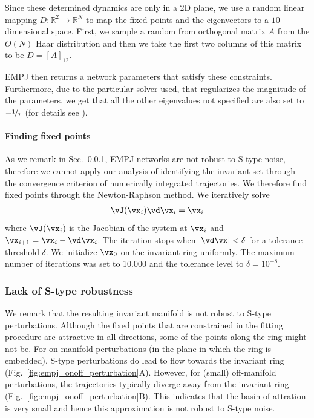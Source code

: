 \documentclass{article} %
\newcounter{ct}
\newcommand{\reals}{\mathbb{R}}
\theoremstyle{definition}
\theoremstyle{remark}
\begin{document}
Since these determined dynamics are only in a 2D plane, we use a random linear mapping \(D\colon\reals^{2}\rightarrow\reals^{N}\) to map the fixed points and the eigenvectors to a \(10\)-dimensional space. First, we sample a random from orthogonal matrix \(A\) from the \(O(N)\) Haar distribution and then we take the first two columns of this matrix to be \(D=[A]_{12}\).

EMPJ then returns a network parameters that satisfy these constraints. Furthermore, due to the particular solver used, that regularizes the magnitude of the parameters, we get that all the other eigenvalues not specified are also set to \(-\nicefrac{1}{\tau}\) (for details see \citep{pollock2020}).






\paragraph{Finding fixed points}
As we remark in Sec.~\ref{sec:empjnonrobust}, EMPJ networks are not robust to S-type noise, therefore we cannot apply our analysis of identifying the invariant set through the convergence criterion of numerically integrated trajectories.
We therefore find fixed points through the Newton-Raphson method.
We iteratively solve
\begin{align}
 \vJ(\vx_{i})\vd\vx_{i} = \vx_{i}
\end{align}
where \(\vJ(\vx_{i})\) is the Jacobian of the system at \(\vx_{i}\) and \(\vx_{i + 1}=\vx_{i}-\vd\vx_{i}\).
The iteration stops when \(|\vd\vx|<\delta\) for a tolerance threshold \(\delta\).
We initialize \(\vx_{0}\) on the invariant ring uniformly.
The maximum number of iterations was set to 10.000 and the tolerance level to \(\delta = 10^{-8}\).

\subsubsection{Lack of S-type robustness}\label{sec:empjnonrobust}
We remark that the resulting invariant manifold is not robust to S-type perturbations.
Although the fixed points that are constrained in the fitting procedure are attractive in all directions, some of the points along the ring might not be.
For on-manifold perturbations (in the plane in which the ring is embedded), S-type perturbations do lead to flow towards the invariant ring (Fig.~\ref{fig:empj_onoff_perturbation}A).
However, for (small) off-manifold perturbations, the trajectories typically diverge away from the invariant ring (Fig.~\ref{fig:empj_onoff_perturbation}B).
This indicates that the basin of attration is very small and hence this approximation is not robust to S-type noise.
\end{document}
